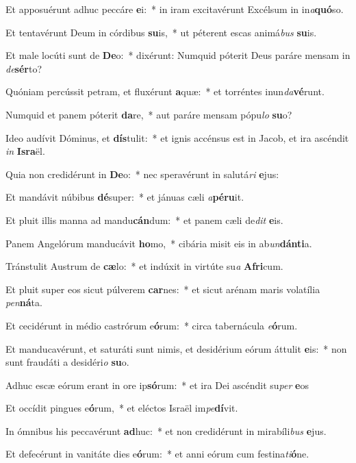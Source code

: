 \item Et apposuérunt adhuc peccáre \textbf{e}i:~* in iram excitavérunt Excélsum in in\textit{a}\textbf{quó}so.
\item Et tentavérunt Deum in córdibus \textbf{su}is,~* ut péterent escas animá\textit{bus} \textbf{su}is.
\item Et male locúti sunt de \textbf{De}o:~* dixérunt: Numquid póterit Deus paráre mensam in \textit{de}\textbf{sér}to?
\item Quóniam percússit petram, et fluxérunt \textbf{a}quæ:~* et torréntes inun\textit{da}\textbf{vé}runt.
\item Numquid et panem póterit \textbf{da}re,~* aut paráre mensam pópu\textit{lo} \textbf{su}o?
\item Ideo audívit Dóminus, et \textbf{dís}tulit:~* et ignis accénsus est in Jacob, et ira ascéndit \textit{in} \textbf{Is}\textbf{ra}ël.
\item Quia non credidérunt in \textbf{De}o:~* nec speravérunt in salutá\textit{ri} \textbf{e}jus:
\item Et mandávit núbibus \textbf{dé}super:~* et jánuas cæli \textit{a}\textbf{pé}\textbf{ru}it.
\item Et pluit illis manna ad mandu\textbf{cán}dum:~* et panem cæli de\textit{dit} \textbf{e}is.
\item Panem Angelórum manducávit \textbf{ho}mo,~* cibária misit eis in ab\textit{un}\textbf{dán}\textbf{ti}a.
\item Tránstulit Austrum de \textbf{cæ}lo:~* et indúxit in virtúte su\textit{a} \textbf{A}\textbf{fri}cum.
\item Et pluit super eos sicut púlverem \textbf{car}nes:~* et sicut arénam maris volatília \textit{pen}\textbf{ná}ta.
\item Et cecidérunt in médio castrórum e\textbf{ó}rum:~* circa tabernácula \textit{e}\textbf{ó}rum.
\item Et manducavérunt, et saturáti sunt nimis, et desidérium eórum áttulit \textbf{e}is:~* non sunt fraudáti a desidéri\textit{o} \textbf{su}o.
\item Adhuc escæ eórum erant in ore ip\textbf{só}rum:~* et ira Dei ascéndit su\textit{per} \textbf{e}os
\item Et occídit pingues e\textbf{ó}rum,~* et eléctos Israël im\textit{pe}\textbf{dí}vit.
\item In ómnibus his peccavérunt \textbf{ad}huc:~* et non credidérunt in mirabíli\textit{bus} \textbf{e}jus.
\item Et defecérunt in vanitáte dies e\textbf{ó}rum:~* et anni eórum cum festina\textit{ti}\textbf{ó}ne.
